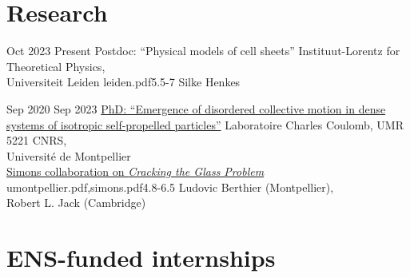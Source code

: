 \documentclass[a4paper]{cvtemplate_en} %
\begin{document}
\makeprofile %


\vspace{2mm}
\section{Research}

\begin{cvbody}

\cvitem
	{Oct 2023}
	{Present}
  {Postdoc: ``Physical models of cell sheets''}
  {Instituut-Lorentz for Theoretical Physics,\\ Universiteit Leiden }
  {leiden.pdf}{5.5}{-7}
	{Silke Henkes}
  {\\}

\cvitem
	{Sep 2020}
	{Sep 2023}
  {\href{https://theses.hal.science/tel-04530690v1}{PhD: ``Emergence of disordered collective motion in dense systems of isotropic self-propelled particles''}}
  {Laboratoire Charles Coulomb, UMR 5221 CNRS,\\ Universit\'e de Montpellier \\
  \href{https://scglass.uchicago.edu}{Simons collaboration on \textit{Cracking the Glass Problem}}}
  {umontpellier.pdf,simons.pdf}{4.8}{-6.5}
	{Ludovic Berthier (Montpellier),\\ Robert L. Jack (Cambridge)}
  {\\}

\end{cvbody}

\section{ENS-funded internships}
\end{document}
